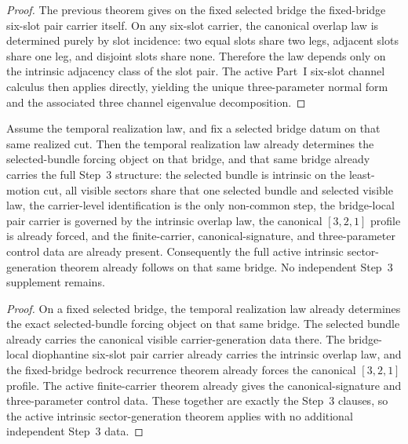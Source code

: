 \begin{proof}
The previous theorem gives on the fixed selected bridge the fixed-bridge
six-slot pair carrier itself. On any six-slot carrier, the canonical overlap
law is determined purely by slot incidence: two equal slots share two legs,
adjacent slots share one leg, and disjoint slots share none. Therefore the law
depends only on the intrinsic adjacency class of the slot pair. The active
Part~I six-slot channel calculus then applies directly, yielding the unique
three-parameter normal form and the associated three channel eigenvalue
decomposition.
\end{proof}

\begin{theorem}
\label{thm:temporal-law-reduces-step-3-to-canonical-carrier-generation-on-a-fixed-bridge}
Assume the temporal realization law, and fix a selected bridge datum on that
same realized cut. Then the temporal realization law already determines the selected-bundle
forcing object on that bridge, and that same bridge already carries the full
Step~3 structure: the selected bundle is intrinsic on the
least-motion cut, all visible sectors share that one selected bundle and
selected visible law, the carrier-level identification is the only non-common step,
the bridge-local pair carrier is governed by the intrinsic overlap law, the
canonical \([3,2,1]\) profile is already forced, and the finite-carrier,
canonical-signature, and three-parameter control data are already present.
Consequently the full active intrinsic sector-generation theorem already
follows on that same bridge. No independent Step~3 supplement remains.
\end{theorem}

\begin{proof}
On a fixed selected bridge, the temporal realization law already determines
the exact selected-bundle forcing object on that same bridge. The selected
bundle already carries the canonical visible carrier-generation data there.
The bridge-local diophantine six-slot pair carrier already carries the
intrinsic overlap law, and the fixed-bridge bedrock recurrence theorem already
forces the canonical \([3,2,1]\) profile. The active finite-carrier theorem
already gives the canonical-signature and three-parameter control data.
These together are exactly the Step~3 clauses, so the active
intrinsic sector-generation theorem applies with no additional independent
Step~3 data.
\end{proof}

